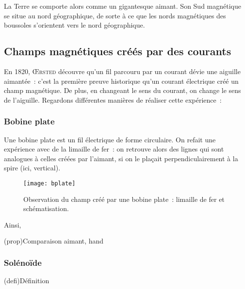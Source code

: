 \documentclass[../../main/main.tex]{subfiles}
\begin{document}
La Terre se comporte alors comme un gigantesque aimant. Son Sud magnétique se
situe au nord géographique, de sorte à ce que les nords magnétiques des
boussoles s'orientent vers le nord géographique.

\subsection{Champs magnétiques créés par des courants}
\label{ssec:chpcour}

En 1820, \textsc{Œrsted} découvre qu'un fil parcouru par un courant dévie une
aiguille aimantée~: c'est la première preuve historique qu'un courant électrique
créé un champ magnétique. De plus, en changeant le sens du courant, on change le
sens de l'aiguille. Regardons différentes manières de réaliser cette
expérience~:

\subsubsection{Bobine plate}
\label{sssec:bplate}
Une bobine plate est un fil électrique de forme circulaire. On refait une
expérience avec de la limaille de fer~: on retrouve alors des lignes qui sont
analogues à celles créées par l'aimant, si on le plaçait perpendiculairement à
la spire (ici, vertical).

\begin{figure}[h]
	\centering
	\texttt{[image: bplate]}

	\caption{Observation du champ créé par une bobine plate~: limaille de fer et
		schématisation.}
	\label{fig:bplate}
\end{figure}
Ainsi,
\begin{tcb}(prop){Comparaison aimant, hand}
	\begin{center}
	\end{center}
\end{tcb}

\subsubsection{Solénoïde}
\label{sssec:solen}
\begin{tcb}(defi){Définition}
	\begin{center}
	\end{center}
\end{tcb}
\end{document}
